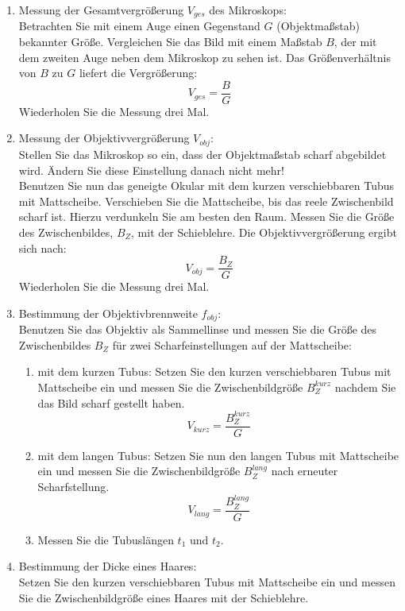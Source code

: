 \begin{enumerate}
 \item Messung der Gesamtvergrößerung $V_{ges}$ des Mikroskops:\\
  Betrachten Sie mit einem Auge einen Gegenstand $G$ (Objektmaßstab) bekannter Größe. Vergleichen Sie das Bild mit einem Maßstab $B$, der mit dem zweiten Auge neben dem Mikroskop zu sehen ist. Das Größenverhältnis von $B$ zu $G$ liefert die Vergrößerung:
  \[
  V_{ges} = \frac{B}{G}
  \]
  Wiederholen Sie die Messung drei Mal.
 \item Messung der Objektivvergrößerung $V_{obj}$:\\
  Stellen Sie das Mikroskop so ein, dass der Objektmaßstab scharf abgebildet wird. Ändern Sie diese Einstellung danach nicht mehr!\\
  Benutzen Sie nun das geneigte Okular mit dem kurzen verschiebbaren Tubus mit Mattscheibe. Verschieben Sie die Mattscheibe, bis das reele Zwischenbild scharf ist. Hierzu verdunkeln Sie am besten den Raum. Messen Sie die Größe des Zwischenbildes, $B_Z$, mit der Schieblehre. Die Objektivvergrößerung ergibt sich nach:
  \[
  V_{obj} = \frac{B_Z}{G}
  \]
  Wiederholen Sie die Messung drei Mal.
 \item Bestimmung der Objektivbrennweite $f_{obj}$:\\
  Benutzen Sie das Objektiv als Sammellinse und messen Sie die Größe des Zwischenbildes $B_Z$ für zwei Scharfeinstellungen auf der Mattscheibe:
  \begin{enumerate}
   \item mit dem kurzen Tubus: Setzen Sie den kurzen verschiebbaren Tubus mit Mattscheibe ein und messen Sie die Zwischenbildgröße $B_Z^{kurz}$ nachdem Sie das Bild scharf gestellt haben.
    \[
     V_{kurz} = \frac{B_Z^{kurz}}{G}
    \]
   \item mit dem langen Tubus: Setzen Sie nun den langen Tubus mit Mattscheibe ein und messen Sie die Zwischenbildgröße $B_Z^{lang}$ nach erneuter Scharfstellung.
    \[
     V_{lang} = \frac{B_Z^{lang}}{G}
    \]
   \item Messen Sie die Tubuslängen $t_1$ und $t_2$.
  \end{enumerate}
 \item Bestimmung der Dicke eines Haares:\\
  Setzen Sie den kurzen verschiebbaren Tubus mit Mattscheibe ein und messen Sie die Zwischenbildgröße eines Haares mit der Schieblehre. 
\end{enumerate}

